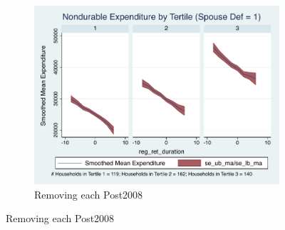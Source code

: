 \documentclass[11pt,onecolumn]{article}
\numberwithin{figure}{section}
\begin{document}
\begin{figure}
\begin{subfigure}{1.0\textwidth}
	\caption{Removing each Post2008}
	\centering
	\includegraphics[width=0.8\linewidth]{../ConsumptionPostRetirement_by_SpouseDef/Smoothed/post_2005/spouse_def_1.pdf}
	\end{subfigure}
	\vspace{1cm}


\end{figure}
\end{document}
